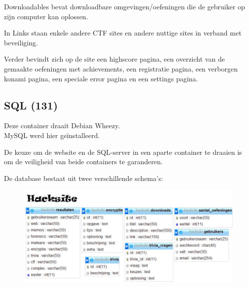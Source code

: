 Downloadables bevat downloadbare omgevingen/oefeningen die de gebruiker op zijn computer kan oplossen.

In Links staan enkele andere CTF sites en andere nuttige sites in verband met beveiliging.

Verder bevindt zich op de site een highscore pagina, een overzicht van de gemaakte oefeningen met achievements, een registratie pagina, een verborgen konami pagina, een speciale error pagina en een settings pagina.
\subsection{SQL (131)}
Deze container draait Debian Wheezy.\\
MySQL werd hier ge\"installeerd.

De keuze om de website en de SQL-server in een aparte container te draaien is om de veiligheid van beide containers te garanderen.

De database bestaat uit twee verschillende schema’s:
\begin{figure}[H]

\includegraphics[scale=0.5,bb= 0 0 0 380]{systeem/db1.jpg}
\end{figure}

